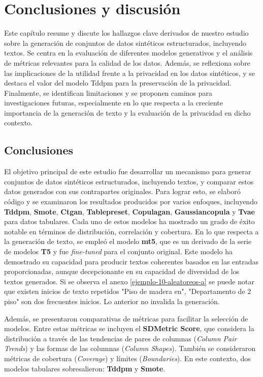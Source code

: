 \chapter{Conclusiones y discusión}
\label{chap:conclusion}
Este capítulo resume y discute los hallazgos clave derivados de nuestro estudio sobre la generación de conjuntos de datos sintéticos estructurados, incluyendo textos. Se centra en la evaluación de diferentes modelos generativos y el análisis de métricas relevantes para la calidad de los datos. Además, se reflexiona sobre las implicaciones de la utilidad frente a la privacidad en los datos sintéticos, y se destaca el valor del modelo Tddpm para la preservación de la privacidad. Finalmente, se identifican limitaciones y se proponen caminos para investigaciones futuras, especialmente en lo que respecta a la creciente importancia de la generación de texto y la evaluación de la privacidad en dicho contexto.

\section{Conclusiones}
\label{sec:conclusion}
El objetivo principal de este estudio fue desarrollar un mecanismo para generar conjuntos de datos sintéticos estructurados, incluyendo textos, y comparar estos datos generados con sus contrapartes originales. Para lograr esto, se elaboró código y se examinaron los resultados producidos por varios enfoques, incluyendo \textbf{Tddpm}, \textbf{Smote}, \textbf{Ctgan}, \textbf{Tablepreset}, \textbf{Copulagan}, \textbf{Gaussiancopula} y \textbf{Tvae} para datos tabulares. Cada uno de estos modelos ha mostrado un grado de éxito notable en términos de distribución, correlación y cobertura. En lo que respecta a la generación de texto, se empleó el modelo \textbf{mt5}, que es un derivado de la serie de modelos \textbf{T5} y fue \emph{fine-tuned} para el conjunto original. Este modelo ha demostrado su capacidad para producir textos coherentes basados en las entradas proporcionadas, aunque decepcionante en su capacidad de diversidad de los textos generados. Si se observa el anexo \ref{ejemplo-10-aleatoreos-a} se puede notar que existen inicios de texto repetidos "Piso de madera en", "Departamento de 2 piso" son dos frecuentes inicios. Lo anterior no invalida la generación.


Además, se presentaron comparativas de métricas para facilitar la selección de modelos. Entre estas métricas se incluyen el \textbf{SDMetric Score}, que considera la distribución a través de las tendencias de pares de columnas (\emph{Column Pair Trends}) y las formas de las columnas (\emph{Column Shapes}). También se consideraron métricas de cobertura (\emph{Coverage}) y límites (\emph{Boundaries}). En este contexto, dos modelos tabulares sobresalieron: \textbf{Tddpm} y \textbf{Smote}.

